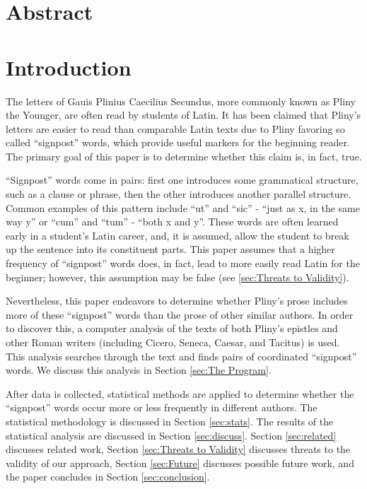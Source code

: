 \section{Abstract}
    

\section{Introduction}
\label{sec:Intro}

The letters of Gauis Plinius Caecilius Secundus, more commonly known as Pliny the Younger, are often read by students of Latin.  It has been claimed \cite{Woodmanpm} that Pliny's letters are easier to read than comparable Latin texts due to Pliny favoring so called ``signpost'' words, which provide useful markers for the beginning reader. The primary goal of this paper is to determine whether this claim is, in fact, true.

``Signpost'' words come in pairs: first one introduces some grammatical structure, such as a clause or phrase, then the other introduces another parallel structure. Common examples of this pattern include ``ut'' and ``sic'' - ``just as x, in the same way y'' or ``cum'' and ``tum'' - ``both x and y''. These words are often learned early in a student's Latin career, and, it is assumed, allow the student to break up the sentence into its constituent parts. This paper assumes that a higher frequency of ``signpost'' words does, in fact, lead to more easily read Latin for the beginner; however, this assumption may be false (see \ref{sec:Threats to Validity}).

Nevertheless, this paper endeavors to determine whether Pliny's prose includes more of these ``signpost'' words than the prose of other similar authors. In order to discover this, a computer analysis of the texts of both Pliny's epistles and other Roman writers (including Cicero, Seneca, Caesar, and Tacitus) is used. This analysis searches through the text and finds pairs of coordinated ``signpost'' words. We discuss this analysis in Section \ref{sec:The Program}.
 
After data is collected, statistical methods are applied to determine whether the ``signpost'' words occur more or less frequently in different authors. The statistical methodology is discussed in Section \ref{sec:stats}. The results of the statistical analysis are discussed in Section \ref{sec:discuss}. Section \ref{sec:related} discusses related work, Section \ref{sec:Threats to Validity} discusses threats to the validity of our approach, Section \ref{sec:Future} discusses possible future work, and the paper concludes in Section \ref{sec:conclusion}.

